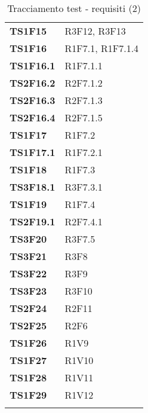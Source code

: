 {\begin{minipage}[b]{.9\linewidth}
\begin{longtable}{C{2.5cm} | C{5cm} }
		\textbf{TS1F15} & R3F12, R3F13\\
		\textbf{TS1F16} & R1F7.1, R1F7.1.4\\
		\textbf{TS1F16.1} & R1F7.1.1\\
		\textbf{TS2F16.2} & R2F7.1.2\\
		\textbf{TS2F16.3} & R2F7.1.3\\				
		\textbf{TS2F16.4} & R2F7.1.5\\	
		\textbf{TS1F17} & R1F7.2\\
		\textbf{TS1F17.1} & R1F7.2.1\\
		\textbf{TS1F18} & R1F7.3\\
		\textbf{TS3F18.1} & R3F7.3.1\\
		\textbf{TS1F19} & R1F7.4\\
		\textbf{TS2F19.1} & R2F7.4.1\\
		\textbf{TS3F20} & R3F7.5\\
		\textbf{TS3F21} & R3F8\\
		\textbf{TS3F22} & R3F9\\
		\textbf{TS3F23} & R3F10\\
		\textbf{TS2F24} & R2F11\\
		\textbf{TS2F25} & R2F6\\
		\textbf{TS1F26} & R1V9\\
		\textbf{TS1F27} & R1V10\\
		\textbf{TS1F28} & R1V11\\
		\textbf{TS1F29} & R1V12\\
		
		\caption{Tracciamento test - requisiti (2)}
	\end{longtable}
\end{minipage}
}